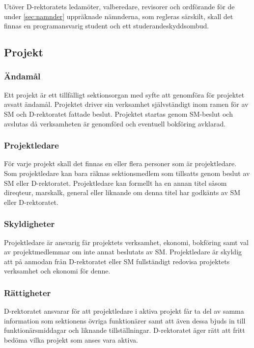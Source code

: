 \documentclass[a4paper,12pt]{article}
\begin{document}
Utöver D-rektoratets ledamöter, valberedare, revisorer och ordförande för de under \ref{sec:namnder} uppräknade nämnderna, som regleras särskilt, skall det finnas en programansvarig student och ett studerandeskyddsombud.

\subsection{Projekt}

\subsubsection{Ändamål}

Ett projekt är ett tillfälligt sektionsorgan med syfte att genomföra för
projektet avsatt ändamål. Projektet driver sin verksamhet självständigt inom
ramen för av SM och D-rektoratet fattade beslut. Projektet startas genom
SM-beslut och avslutas då verksamheten är genomförd och eventuell bokföring
avklarad.

\subsubsection{Projektledare}

För varje projekt skall det finnas en eller flera personer som är
projektledare. Som projektledare kan bara räknas sektionsmedlem som tillsatts
genom beslut av SM eller D-rektoratet. Projektledare kan formellt ha en annan
titel såsom direqteur, marskalk, general eller liknande om denna titel har
godkänts av SM eller D-rektoratet.

\subsubsection{Skyldigheter}

Projektledare är ansvarig fär projektets verksamhet, ekonomi, bokföring samt
val av projektmedlemmar om inte annat beslutats av SM. Projektledare är
skyldig att på anmodan från D-rektoratet eller SM fullständigt redovisa
projektets verksamhet och ekonomi för denne.

\subsubsection{Rättigheter}

D-rektoratet ansvarar för att projektledare i aktiva projekt får ta del av
samma information som sektionens övriga funktionärer samt att även dessa bjuds
in till funktionärsmiddagar och liknande tillställningar. D-rektoratet äger
rätt att fritt bedöma vilka projekt som anses vara aktiva.
\end{document}

